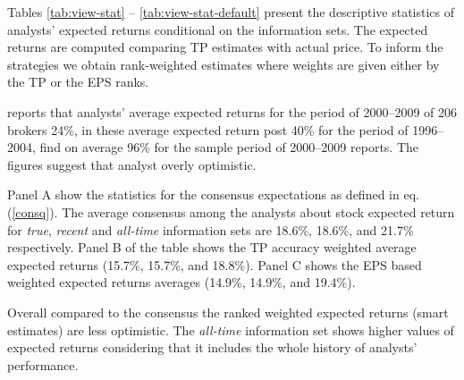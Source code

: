 \documentclass{article}
\newcommand{\tr}{\textit{true}}
\newcommand{\naive}{\textit{recent}}
\newcommand{\default}{\textit{all-time}}
\begin{document}
Tables \ref{tab:view-stat} -- \ref{tab:view-stat-default} present the descriptive statistics of analysts' expected returns conditional on the information sets. The expected returns  are computed comparing TP estimates with actual price. To inform the strategies we obtain rank-weighted estimates where weights are given either by the TP or the EPS ranks. 

\cite{bradshaw2002} reports that analysts' average expected returns for the period of 2000--2009 of 206 brokers 24\%, in \cite{da2011} these average expected return post 40\% for the period of 1996--2004, \cite{zhou2013} find on average  96\% for the sample period of 2000--2009 reports. The figures suggest that analyst overly optimistic.

Panel A show the statistics for the consensus expectations as defined in eq. (\ref{consq}). The average consensus among the analysts about stock expected return for \tr{}, \naive{} and \default{} information sets are 18.6\%, 18.6\%, and 21.7\% respectively. Panel B of the table shows the TP accuracy weighted average expected returns (15.7\%, 15.7\%, and 18.8\%). Panel C shows the EPS based weighted expected returns averages (14.9\%, 14.9\%, and 19.4\%). 

Overall compared to the consensus the ranked weighted expected returns (smart estimates) are less optimistic. The \default{} information set shows higher values of expected returns considering that it includes the whole history of analysts' performance.


\end{document}
